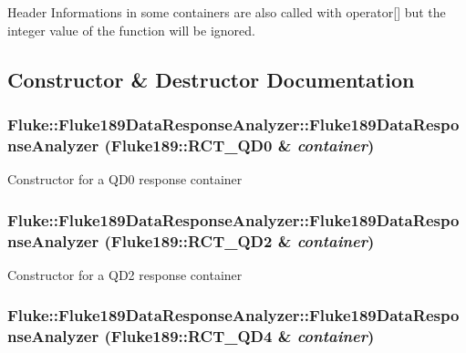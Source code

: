 Header Informations in some containers are also called with operator\mbox{[}\mbox{]} but the integer value of the function will be ignored. 

\subsection{Constructor \& Destructor Documentation}
\hypertarget{classFluke_1_1Fluke189DataResponseAnalyzer_a37d9cf81e6d7eee9ea5cf3cd77306dad}{
\subsubsection[{Fluke189DataResponseAnalyzer}]{\setlength{\rightskip}{0pt plus 5cm}Fluke::Fluke189DataResponseAnalyzer::Fluke189DataResponseAnalyzer ({\bf Fluke189::RCT\_\-QD0} \& {\em container})}}
\label{classFluke_1_1Fluke189DataResponseAnalyzer_a37d9cf81e6d7eee9ea5cf3cd77306dad}
Constructor for a QD0 response container \hypertarget{classFluke_1_1Fluke189DataResponseAnalyzer_a7dd45e9e69f5dbc486c619e33275af58}{
\subsubsection[{Fluke189DataResponseAnalyzer}]{\setlength{\rightskip}{0pt plus 5cm}Fluke::Fluke189DataResponseAnalyzer::Fluke189DataResponseAnalyzer ({\bf Fluke189::RCT\_\-QD2} \& {\em container})}}
\label{classFluke_1_1Fluke189DataResponseAnalyzer_a7dd45e9e69f5dbc486c619e33275af58}
Constructor for a QD2 response container \hypertarget{classFluke_1_1Fluke189DataResponseAnalyzer_a2501e803c1b0f92dee5d1c1249be62bc}{
\subsubsection[{Fluke189DataResponseAnalyzer}]{\setlength{\rightskip}{0pt plus 5cm}Fluke::Fluke189DataResponseAnalyzer::Fluke189DataResponseAnalyzer ({\bf Fluke189::RCT\_\-QD4} \& {\em container})}}
